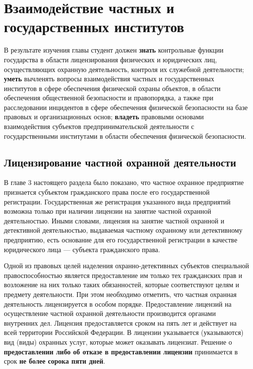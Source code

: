 \documentclass[a4paper,12pt,fleqn]{article} %
\begin{document}
\section{Взаимодействие частных и государственных институтов}

\begin{tcolorbox}[colback=blue!40!red!10!,colframe=blue!40!red]
В результате изучения главы студент должен \textbf{знать} контрольные функции государства в области лицензирования физических и юридических лиц, осуществляющих охранную деятельность, контроля их служебной деятельности; \textbf{уметь} вычленять  вопросы взаимодействия частных и государственных институтов в сфере обеспечения физической охраны объектов, в области обеспечения общественной безопасности и правопорядка, а также при расследовании инцидентов в сфере обеспечения физической безопасности на базе правовых и организационных основ; \textbf{владеть} правовыми основами взаимодействия субъектов предпринимательской деятельности с государственными институтами в области обеспечения физической безопасности.
\end{tcolorbox}

\subsection{Лицензирование частной охранной деятельности}


В главе 3 настоящего раздела было показано, что частное охранное предприятие признается субъектом гражданского права после его государственной регистрации. Государственная же регистрация указанного вида предприятий возможна только при наличии лицензии на занятие частной охранной деятельностью. Иными словами, лицензия на занятие частной охранной и детективной деятельностью, выдаваемая частному охранному или детективному предприятию, есть основание для его государственной регистрации в качестве юридического лица — субъекта гражданского права.

Одной из правовых целей наделения охранно-детективных субъектов специальной правоспособностью является предоставление им только тех гражданских прав и возложение на них только таких обязанностей, которые соответствуют целям и предмету деятельности. При этом необходимо отметить, что частная охранная деятельность лицензируется в особом порядке. 	Предоставление лицензий на осуществление частной охранной деятельности производится органами внутренних дел. Лицензия предоставляется сроком на пять лет и действует на всей территории Российской Федерации. В лицензии указывается (указываются) вид (виды) охранных услуг, которые может оказывать лицензиат. Решение о \textbf{предоставлении либо об отказе в предоставлении лицензии} принимается в срок \textbf{не более сорока пяти дней}.
\end{document}

